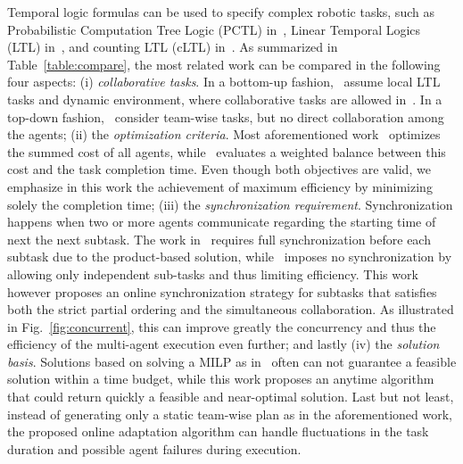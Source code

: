 Temporal logic formulas can be used to specify complex robotic tasks,
such as Probabilistic Computation Tree Logic (PCTL) in~\citep{lahijanian2011temporal},
Linear Temporal Logics (LTL) in~\citep{kantaros2020stylus, schillinger2018simultaneous,
 guo2015multi, chen2011formal},
and counting LTL (cLTL) in~\citep{sahin2019multirobot}.
As summarized in Table~\ref{table:compare},
the most related work can be compared in the following four aspects:
(i) \emph{collaborative tasks}.
In a bottom-up fashion,~\citep{guo2015multi, tumova2016multi, guo2016task} assume local LTL tasks and dynamic environment,
where collaborative tasks are allowed in~\citep{guo2016task}.
In a top-down fashion,~\citep{kantaros2020stylus, schillinger2018simultaneous, luo2021temporal, sahin2019multirobot, jones2019scratchs} consider team-wise tasks,
but no direct collaboration among the agents;
(ii) the \emph{optimization criteria}.
Most aforementioned work~\citep{kantaros2020stylus, guo2016task, luo2021temporal, sahin2019multirobot, jones2019scratchs} optimizes
the summed cost of all agents,
while~\citep{schillinger2018simultaneous} evaluates a weighted balance between this cost and
the task completion time.
Even though both objectives are valid,
we emphasize in this work the achievement of maximum efficiency by minimizing solely the completion time;
(iii) the \emph{synchronization requirement}.
Synchronization happens when two or more agents communicate regarding the starting time of next the next subtask.
The work in~\citep{kantaros2020stylus, luo2021abstraction, sahin2019multirobot} requires
full synchronization before each subtask due to the product-based solution,
while~\citep{schillinger2018simultaneous} imposes no synchronization by allowing
only independent sub-tasks and thus limiting efficiency.
This work however proposes an online synchronization strategy for subtasks
that satisfies both the strict partial ordering and the simultaneous collaboration.
As illustrated in Fig.~\ref{fig:concurrent},
this can improve greatly the concurrency and thus the efficiency of the multi-agent execution even further;
and lastly
(iv) the \emph{solution basis}.
Solutions based on solving a MILP as in~\citep{luo2021temporal, sahin2019multirobot, jones2019scratchs} often can not guarantee a feasible solution within a time budget,
while this work proposes an anytime algorithm that could return quickly a feasible
and near-optimal solution.
Last but not least,
instead of generating only a static team-wise plan as in the aforementioned work,
the proposed online adaptation algorithm can handle fluctuations in the task duration
and possible agent failures during execution.

